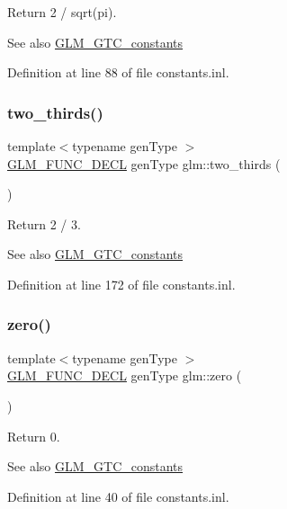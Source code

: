 Return 2 / sqrt(pi). \begin{DoxySeeAlso}{See also}
\hyperlink{group__gtc__constants}{G\+L\+M\+\_\+\+G\+T\+C\+\_\+constants} 
\end{DoxySeeAlso}


Definition at line 88 of file constants.\+inl.

\mbox{\label{group__gtc__constants_gadde7f2efce3b14c8b26944fbafed4a10}} 
\subsubsection{\texorpdfstring{two\+\_\+thirds()}{two\_thirds()}}
{\footnotesize\ttfamily template$<$typename gen\+Type $>$ \\
\hyperlink{setup_8hpp_ab2d052de21a70539923e9bcbf6e83a51}{G\+L\+M\+\_\+\+F\+U\+N\+C\+\_\+\+D\+E\+CL} gen\+Type glm\+::two\+\_\+thirds (\begin{DoxyParamCaption}{ }\end{DoxyParamCaption})}

Return 2 / 3. \begin{DoxySeeAlso}{See also}
\hyperlink{group__gtc__constants}{G\+L\+M\+\_\+\+G\+T\+C\+\_\+constants} 
\end{DoxySeeAlso}


Definition at line 172 of file constants.\+inl.

\mbox{\label{group__gtc__constants_ga5cc97dd01d37fc199264ff6030578435}} 
\subsubsection{\texorpdfstring{zero()}{zero()}}
{\footnotesize\ttfamily template$<$typename gen\+Type $>$ \\
\hyperlink{setup_8hpp_ab2d052de21a70539923e9bcbf6e83a51}{G\+L\+M\+\_\+\+F\+U\+N\+C\+\_\+\+D\+E\+CL} gen\+Type glm\+::zero (\begin{DoxyParamCaption}{ }\end{DoxyParamCaption})}

Return 0. \begin{DoxySeeAlso}{See also}
\hyperlink{group__gtc__constants}{G\+L\+M\+\_\+\+G\+T\+C\+\_\+constants} 
\end{DoxySeeAlso}


Definition at line 40 of file constants.\+inl.

